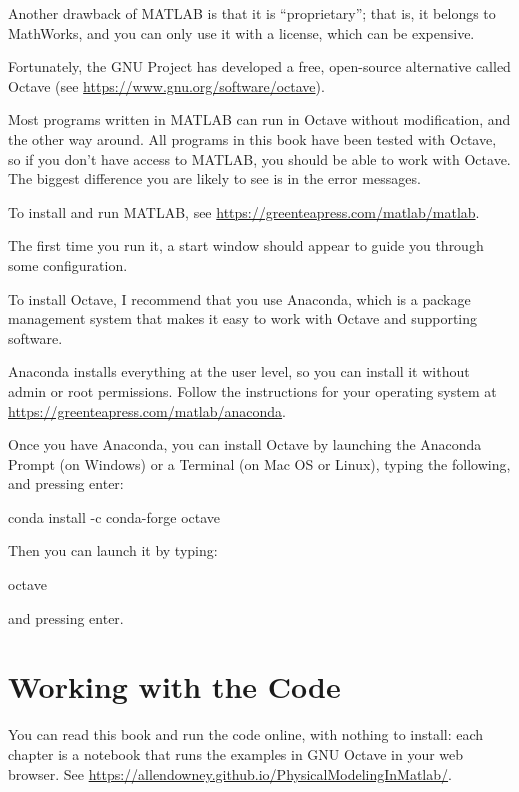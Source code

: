 Another drawback of MATLAB is that it is ``proprietary''; that is, it belongs to MathWorks, and you can only use it with a license, which can be expensive.

Fortunately, the GNU Project has developed a free, open-source alternative called Octave (see \url{https://www.gnu.org/software/octave}).

Most programs written in MATLAB can run in Octave without modification, and the other way around.  All programs in this book have been tested with Octave, so if you don't have access to MATLAB, you should be able to work with Octave.  The biggest difference you are likely to see is in the error messages.

To install and run MATLAB, see \url{https://greenteapress.com/matlab/matlab}.

The first time you run it, a start window should appear to guide you through some configuration.

To install Octave, I recommend that you use Anaconda, which is a package management system that makes it easy to work with Octave and supporting software.

Anaconda installs everything at the user level, so you can install it without admin or root permissions.  Follow the instructions for your operating system at \url{https://greenteapress.com/matlab/anaconda}.

Once you have Anaconda, you can install Octave by launching the Anaconda Prompt (on Windows) or a Terminal (on Mac OS or Linux), typing the following, and pressing \textsf{enter}:

\begin{code}
conda install -c conda-forge octave
\end{code}

Then you can launch it by typing:

\begin{code}
octave
\end{code}

and pressing \textsf{enter}.


\section{Working with the Code}

You can read this book and run the code online, with nothing to install: each chapter is a notebook that runs the examples in GNU Octave in your web browser.
See \url{https://allendowney.github.io/PhysicalModelingInMatlab/}.

